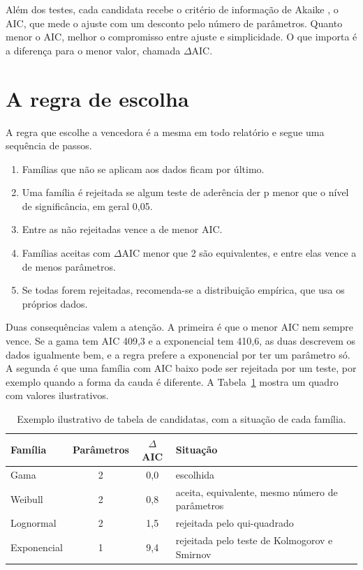 Além dos testes, cada candidata recebe o critério de informação de Akaike \cite{akaike1974}, o AIC, que mede o ajuste com um desconto pelo número de parâmetros. Quanto menor o AIC, melhor o compromisso entre ajuste e simplicidade. O que importa é a diferença para o menor valor, chamada $\Delta$AIC.

\section{A regra de escolha}

A regra que escolhe a vencedora é a mesma em todo relatório e segue uma sequência de passos.

\begin{enumerate}
  \item Famílias que não se aplicam aos dados ficam por último.
  \item Uma família é rejeitada se algum teste de aderência der p menor que o nível de significância, em geral 0,05.
  \item Entre as não rejeitadas vence a de menor AIC.
  \item Famílias aceitas com $\Delta$AIC menor que 2 são equivalentes, e entre elas vence a de menos parâmetros.
  \item Se todas forem rejeitadas, recomenda-se a distribuição empírica, que usa os próprios dados.
\end{enumerate}

Duas consequências valem a atenção. A primeira é que o menor AIC nem sempre vence. Se a gama tem AIC 409,3 e a exponencial tem 410,6, as duas descrevem os dados igualmente bem, e a regra prefere a exponencial por ter um parâmetro só. A segunda é que uma família com AIC baixo pode ser rejeitada por um teste, por exemplo quando a forma da cauda é diferente. A Tabela~\ref{tab-candidatas} mostra um quadro com valores ilustrativos.

\begin{table}[ht]
\centering
\caption{Exemplo ilustrativo de tabela de candidatas, com a situação de cada família.}
\label{tab-candidatas}
\begin{tabular}{@{}lccl@{}}
\toprule
\textbf{Família} & \textbf{Parâmetros} & $\Delta$\textbf{AIC} & \textbf{Situação} \\
\midrule
Gama        & 2 & 0,0 & escolhida \\
Weibull     & 2 & 0,8 & aceita, equivalente, mesmo número de parâmetros \\
Lognormal   & 2 & 1,5 & rejeitada pelo qui-quadrado \\
Exponencial & 1 & 9,4 & rejeitada pelo teste de Kolmogorov e Smirnov \\
\bottomrule
\end{tabular}
\end{table}

